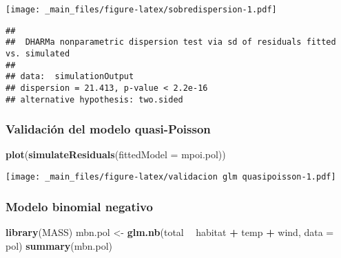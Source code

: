 \documentclass[
]{book}
\newenvironment{Shaded}{\begin{snugshade}}{\end{snugshade}}
\newcommand{\DataTypeTok}[1]{\textcolor[rgb]{0.13,0.29,0.53}{#1}}
\newcommand{\KeywordTok}[1]{\textcolor[rgb]{0.13,0.29,0.53}{\textbf{#1}}}
\newcommand{\NormalTok}[1]{#1}
\newcommand{\OperatorTok}[1]{\textcolor[rgb]{0.81,0.36,0.00}{\textbf{#1}}}
\newcommand{\StringTok}[1]{\textcolor[rgb]{0.31,0.60,0.02}{#1}}
\begin{document}
\texttt{[image: \_main\_files/figure-latex/sobredispersion-1.pdf]}

\begin{verbatim}
## 
##  DHARMa nonparametric dispersion test via sd of residuals fitted vs. simulated
## 
## data:  simulationOutput
## dispersion = 21.413, p-value < 2.2e-16
## alternative hypothesis: two.sided
\end{verbatim}

\hypertarget{validaciuxf3n-del-modelo-quasi-poisson}{%
\subsubsection{Validación del modelo quasi-Poisson}\label{validaciuxf3n-del-modelo-quasi-poisson}}

\begin{Shaded}
\begin{Highlighting}[]
\KeywordTok{plot}\NormalTok{(}\KeywordTok{simulateResiduals}\NormalTok{(}\DataTypeTok{fittedModel =}\NormalTok{ mpoi.pol))}
\end{Highlighting}
\end{Shaded}

\texttt{[image: \_main\_files/figure-latex/validacion glm quasipoisson-1.pdf]}

\hypertarget{modelo-binomial-negativo}{%
\subsubsection{Modelo binomial negativo}\label{modelo-binomial-negativo}}

\begin{Shaded}
\begin{Highlighting}[]
\KeywordTok{library}\NormalTok{(MASS)}
\NormalTok{mbn.pol <-}\StringTok{ }\KeywordTok{glm.nb}\NormalTok{(total }\OperatorTok{~}\StringTok{ }\NormalTok{habitat }\OperatorTok{+}\StringTok{ }\NormalTok{temp }\OperatorTok{+}\StringTok{ }\NormalTok{wind, }\DataTypeTok{data =}\NormalTok{ pol) }
\KeywordTok{summary}\NormalTok{(mbn.pol)}
\end{Highlighting}
\end{Shaded}
\end{document}

